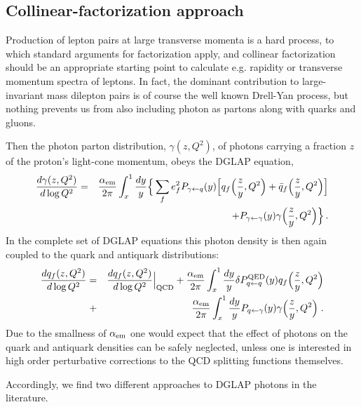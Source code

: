 \subsection{Collinear-factorization approach}

Production of lepton pairs at large transverse momenta is a hard process, to which
standard arguments for factorization apply, and collinear factorization should be an appropriate starting point to calculate e.g. rapidity or transverse momentum spectra of leptons.
In fact, the dominant contribution to large-invariant mass dilepton pairs is of course the well known Drell-Yan process, but nothing prevents us from also including photon as partons along with quarks and gluons.

Then the photon parton distribution, $\gamma(z,Q^2)$, of photons carrying a fraction $z$ of the proton's
light-cone momentum, obeys the DGLAP equation,
\begin{eqnarray}
{d \gamma(z,Q^2) \over d \log Q^2} =&& {\alpha_{\rm{em}} \over 2 \pi} \int_x^1 {dy \over y} 
\Big \{ \sum_f e_f^2 P_{\gamma \leftarrow q}(y) 
\Big[ q_f \Big({z \over y}, Q^2 \Big) + \bar q_f\Big({z \over y},Q^2\Big) \Big] \nonumber \\
&&+ P_{\gamma \leftarrow \gamma}(y) \gamma\Big({z \over y},Q^2\Big) \Big \} \, .
\end{eqnarray}
In the complete set of DGLAP equations this photon density is then again coupled to the quark and antiquark
distributions:
\begin{eqnarray}
 {d q_f(z,Q^2 )\over d \log Q^2} =&& {d q_f(z,Q^2) \over d \log Q^2}\Big|_{\rm{QCD}} + {{\alpha_{\mathrm{em}}} \over 2 \pi} \int_x^1 {dy \over y} 
\delta P_{q \leftarrow q}^{\rm{QED}}(y) q_f\Big({z \over y}, Q^2\Big)
\nonumber \\
+&& {{\alpha_{\mathrm{em}}} \over 2 \pi} \int_x^1 {dy \over y}  P_{q \leftarrow \gamma}(y)
\gamma\Big({z \over y},Q^2\Big) \; . \nonumber \\
\end{eqnarray}
Due to the smallness of $\alpha_{\rm{em}}$ one would expect that the effect of photons on the quark and antiquark densities
can be safely neglected, unless one is interested in high order perturbative corrections to the QCD splitting functions
themselves.

Accordingly, we find two different approaches to DGLAP photons in the literature.

